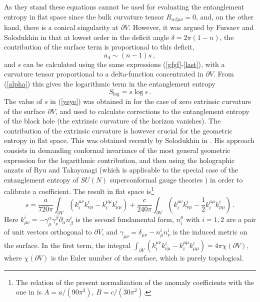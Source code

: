\documentclass[a4paper]{article}
\begin{document}
As they stand these equations cannot be used for evaluating the entanglement entropy in flat space since the bulk curvature tensor $R_{\alpha \beta \mu \nu}=0$, and, on the other hand, there is a conical singularity at $\partial V$. 
 However, it was argued by Fursaev and Solodukhin in \cite{dos} that at lowest order in the deficit angle $\delta=2\pi(1-n)$, the contribution of the surface term is proportional to this deficit,
 \begin{equation}
 a_4\sim (n-1) s\,,\label{yeye}
 \end{equation}
 and $s$ can be calculated using the same expressions (\ref{gfgf}-\ref{last}), with a curvature tensor proportional to a delta-function concentrated in $\partial V$. 
 From (\ref{alpha}) this gives the logarithmic term in the entanglement entropy
 \begin{equation}
 S_{\log}=s \log \epsilon\,.
 \end{equation}
 The value of $s$ in (\ref{yeye}) was obtained in \cite{dos} for the case of zero extrinsic curvature of the surface $\partial V$, and used to calculate corrections to the entanglement entropy of the black hole \cite{dos,cases} (the extrinsic curvature of the horizon vanishes). The contribution of the extrinsic curvature is however crucial for the geometric entropy in flat space. This was obtained recently by Solodukhin in \cite{una}.  His approach consists in demanding conformal invariance of the most general geometric expression for the logarithmic contribution, and then using the holographic anzats of Ryu and Takayanagi (which is applicable to the special case of the entanglement entropy of $SU(N)$ superconformal gauge theories  \cite{hkernel}) in order to calibrate a coefficient. The result in flat space is\footnote{The relation of the present normalization of the anomaly coefficients with the one in \cite{una} is $A=a/(90 \pi^2)$, $B=c/(30 \pi^2)$.} \cite{una}
\begin{equation}
s=\frac{a}{720 \pi} \int_{\partial V}(k_i^{\mu \nu}k^i_{\nu \mu} - k_i^{\mu \mu}k^i_{\mu \mu}) +\frac{c}{240 \pi}   \int_{\partial V}(k_i^{\mu \nu}k^i_{\nu \mu} -\frac{1}{2} k_i^{\mu \mu}k^i_{\mu \mu})\,.\label{turti}
\end{equation}
Here  $k^i_{\mu\nu}=-\gamma^\alpha_\mu \gamma^\beta_\nu \partial_\alpha n^i_\beta$ is the second fundamental form, $n^\mu_i$ with $i=1,2$ are a pair of unit vectors orthogonal to $\partial V$, and $\gamma_{\mu\nu}=\delta_{\mu\nu}-n^i_\mu n^i_\nu$ is the induced metric on the surface. In the first term, the integral $\int_{\partial V}(k_i^{\mu \nu}k^i_{\nu \mu}- k_i^{\mu \mu}k^i_{\mu \mu})=4\pi \chi (\partial V)$, where $\chi (\partial V)$ is the Euler number of the surface, which is purely topological.  
\end{document}
